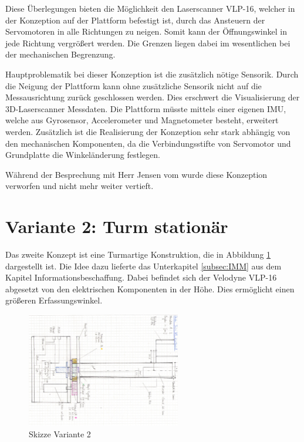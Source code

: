  Diese Überlegungen bieten die Möglichkeit den Laserscanner VLP-16, welcher in der Konzeption auf der Plattform befestigt ist, durch das Ansteuern der Servomotoren in alle Richtungen zu neigen. Somit kann  der Öffnungswinkel in jede Richtung vergrößert werden. Die Grenzen liegen dabei im wesentlichen bei der mechanischen Begrenzung.
 
 Hauptproblematik bei dieser Konzeption ist die zusätzlich nötige Sensorik. Durch die Neigung der Plattform kann ohne zusätzliche Sensorik nicht auf die Messausrichtung zurück geschlossen werden. Dies erschwert die Visualisierung der 3D-Laserscanner Messdaten. Die Plattform müsste mittels einer eigenen \ac{IMU}, welche aus Gyrosensor, Accelerometer und Magnetometer besteht, erweitert werden. Zusätzlich ist die Realisierung der Konzeption sehr stark abhängig von den mechanischen Komponenten, da die Verbindungsstifte von Servomotor und Grundplatte die Winkeländerung festlegen.
 
 Während der Besprechung mit Herr Jensen vom  wurde diese Konzeption verworfen und nicht mehr weiter vertieft.
 

\section {Variante 2: Turm stationär}
\label{sec:var2}

Das zweite Konzept ist eine Turmartige Konstruktion, die in Abbildung \ref{fig:skizze_unrotierend} dargestellt ist. Die Idee dazu lieferte das Unterkapitel \ref{subsec:IMM} aus dem Kapitel Informationsbeschaffung. Dabei befindet sich der Velodyne VLP-16 abgesetzt von den elektrischen Komponenten in der Höhe. Dies ermöglicht einen größeren Erfassungswinkel. 


\begin{figure}[H]
	\centering
	\includegraphics[angle=90,width=0.6\textwidth]{resources/skizze_unrotierend.PNG}
	\caption{Skizze Variante 2 }
	\label{fig:skizze_unrotierend}
\end{figure} 

